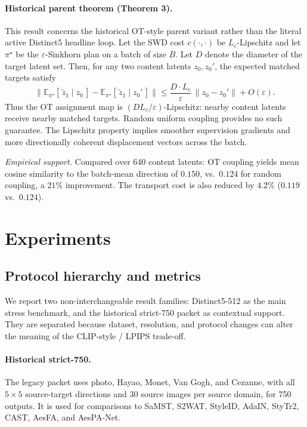 \documentclass[letterpaper]{article}
\begin{document}
\paragraph{Historical parent theorem (Theorem 3).}
This result concerns the historical OT-style parent variant rather than the literal active Distinct5 headline loop.
Let the SWD cost $c(\cdot,\cdot)$ be $L_c$-Lipschitz and let
$\pi^\star$ be the $\varepsilon$-Sinkhorn plan on a batch of size $B$.
Let $D$ denote the diameter of the target latent set.
Then, for any two content latents $z_0,z_0'$, the expected
matched targets satisfy
\begin{equation}
\bigl\|\mathbb{E}_{\pi^\star}[\,\tilde z_1\mid z_0\,]
-\mathbb{E}_{\pi^\star}[\,\tilde z_1\mid z_0'\,]\bigr\|
\leq \frac{D\cdot L_c}{\varepsilon}\,\|z_0-z_0'\| + O(\varepsilon).
\label{eq:ot_lipschitz}
\end{equation}
Thus the OT assignment map is $(D L_c/\varepsilon)$-Lipschitz:
nearby content latents receive nearby matched targets.
Random uniform coupling provides no such guarantee.
The Lipschitz property implies smoother supervision gradients
and more directionally coherent displacement vectors across the batch.

\emph{Empirical support.}
Compared over 640 content latents:
OT coupling yields mean cosine similarity to the batch-mean
direction of $0.150$, vs.\ $0.124$ for random coupling,
a $21\%$ improvement.
The transport cost is also reduced by $4.2\%$ ($0.119$ vs.\ $0.124$).

\section{Experiments}
\subsection{Protocol hierarchy and metrics}
We report two non-interchangeable result families: Distinct5-512 as the main stress benchmark, and the historical strict-750 packet as contextual support. They are separated because dataset, resolution, and protocol changes can alter the meaning of the CLIP-style / LPIPS trade-off.

\paragraph{Historical strict-750.}
The legacy packet uses photo, Hayao, Monet, Van Gogh, and Cezanne, with all $5\times5$ source-target directions and 30 source images per source domain, for 750 outputs. It is used for comparisons to SaMST, S2WAT, StyleID, AdaIN, StyTr2, CAST, AesFA, and AesPA-Net.
\end{document}
